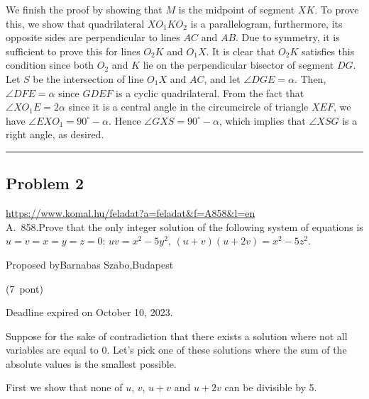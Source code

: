 \documentclass{article}
\begin{document}
We finish the proof by showing that \(\displaystyle M\) is the midpoint of segment \(\displaystyle XK\). To prove this, we show that quadrilateral \(\displaystyle XO_1KO_2\) is a parallelogram, furthermore, its opposite sides are perpendicular to lines \(\displaystyle AC\) and \(\displaystyle AB\). Due to symmetry, it is sufficient to prove this for lines \(\displaystyle O_2K\) and \(\displaystyle O_1X\). It is clear that \(\displaystyle O_2K\) satisfies this condition since both \(\displaystyle O_2\) and \(\displaystyle K\) lie on the perpendicular bisector of segment \(\displaystyle DG\). Let \(\displaystyle S\) be the intersection of line \(\displaystyle O_1X\) and \(\displaystyle AC\), and let \(\displaystyle \angle DGE = \alpha\). Then, \(\displaystyle \angle DFE = \alpha\) since \(\displaystyle GDEF\) is a cyclic quadrilateral. From the fact that \(\displaystyle \angle XO_1E = 2\alpha\) since it is a central angle in the circumcircle of triangle \(\displaystyle XEF\), we have \(\displaystyle \angle EXO_1 = 90^{\circ}-\alpha\). Hence \(\displaystyle \angle GXS=90^{\circ}-\alpha\), which implies that \(\displaystyle \angle XSG\) is a right angle, as desired.

\vspace{1em}
\hrule
\vspace{1em}

\subsection*{Problem 2}
\noindent\url{https://www.komal.hu/feladat?a=feladat&f=A858&l=en}\\[1em]

A. 858.Prove that the only integer solution of the following system of equations is \(\displaystyle u=v=x=y=z=0\): \(\displaystyle uv=x^2-5y^2\), \(\displaystyle (u+v)(u+2v)=x^2-5z^2\).

Proposed byBarnabas Szabo,Budapest

(7 pont)

Deadline expired on October 10, 2023.

Suppose for the sake of contradiction that there exists a solution where not all variables are equal to 0. Let's pick one of these solutions where the sum of the absolute values is the smallest possible.

First we show that none of \(\displaystyle u\), \(\displaystyle v\), \(\displaystyle u+v\) and \(\displaystyle u+2v\) can be divisible by 5.
\end{document}
